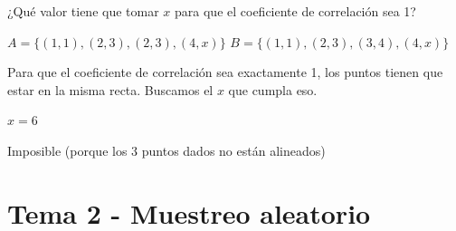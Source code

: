 \begin{problem}[10]
¿Qué valor tiene que tomar $x$ para que el coeficiente de correlación sea 1?

\ppart $A = \{(1,1),(2,3),(2,3),(4,x)\}$
\ppart $B = \{(1,1),(2,3),(3,4),(4,x)\}$

\solution

Para que el coeficiente de correlación sea exactamente 1, los puntos tienen que estar en la misma recta. Buscamos el $x$ que cumpla eso.

\spart $x=6$

\spart Imposible (porque los 3 puntos dados no están alineados)

\end{problem}


\newpage
\section{Tema 2 - Muestreo aleatorio}


